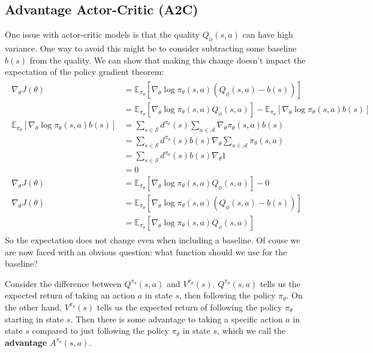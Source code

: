 \documentclass[journal, onecolumn, 12pt, draftclsnofoot]{IEEEtran}
\newcommand{\kword}[1]{\textbf{#1}}
\newcommand{\mc}[1]{\mathcal{#1}}
\begin{document}
		\subsection{Advantage Actor-Critic (A2C)}
		\par One issue with actor-critic models is that the quality $Q_\phi(s,a)$ can have high variance. One way to avoid this might be to consider subtracting some baseline $b(s)$ from the quality. We can show that making this change doesn't impact the expectation of the policy gradient theorem:
		\begin{align}
			\label{eqn:proof-of-baseline-no-differece}
			\begin{split}
				\nabla_\theta J(\theta) &= \mathbb{E}_{\pi_\theta} \left[ \nabla_\theta \log \pi_\theta (s, a) (Q_\phi(s,a) - b(s)) \right]\\
				&= \mathbb{E}_{\pi_\theta} \left[ \nabla_\theta \log \pi_\theta (s, a)Q_\phi(s,a) \right] - \mathbb{E}_{\pi_\theta} \left[ \nabla_\theta \log \pi_\theta (s, a) b(s) \right] \\
				\mathbb{E}_{\pi_\theta} \left[ \nabla_\theta \log \pi_\theta (s, a) b(s) \right] &= \sum_{s \in \mc{S}} d^{\pi_\theta}(s) \sum_{a \in \mc{A}} \nabla_\theta \pi_\theta (s, a) b(s) \\
				&= \sum_{s \in \mc{S}} d^{\pi_\theta}(s) b(s) \nabla_\theta \sum_{a \in \mc{A}}  \pi_\theta (s, a) \\
				&= \sum_{s \in \mc{S}} d^{\pi_\theta}(s) b(s) \nabla_\theta 1 \\
				&= 0 \\
				\nabla_\theta J(\theta) &= \mathbb{E}_{\pi_\theta} \left[ \nabla_\theta \log \pi_\theta (s, a)Q_\phi(s,a) \right] - 0\\
				\nabla_\theta J(\theta) &= \mathbb{E}_{\pi_\theta} \left[ \nabla_\theta \log \pi_\theta (s, a) (Q_\phi(s,a) - b(s)) \right] \\ &= \mathbb{E}_{\pi_\theta} \left[ \nabla_\theta \log \pi_\theta (s, a) Q_\phi(s,a) \right]
			\end{split}
		\end{align}
		So the expectation does not change even when including a baseline. Of couse we are now faced with an obvious question: what function should we use for the baseline?
		\par Consider the difference between $Q^{\pi_\theta}(s,a)$ and $V^{\pi_\theta}(s)$. $Q^{\pi_\theta}(s,a)$ tells us the expected return of taking an action $a$ in state $s$, then following the policy $\pi_\theta$. On the other hand, $V^{\pi_\theta}(s)$ tells us the expected return of following the policy $\pi_\theta$ starting in state $s$. Then there is some advantage to taking a specific action $a$ in state $s$ compared to just following the policy $\pi_\theta$ in state $s$, which we call the \kword{advantage} $A^{\pi_\theta}(s,a)$.
\end{document}
